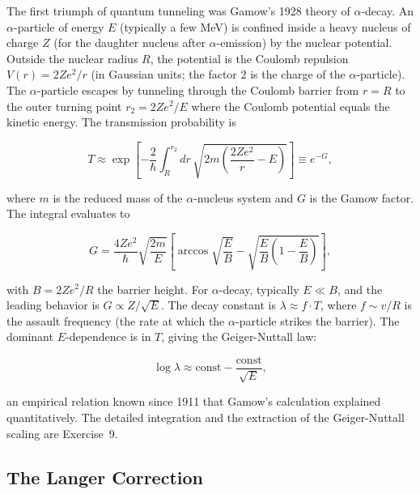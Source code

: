 The first triumph of quantum tunneling was Gamow's 1928 theory of $\alpha$-decay. An $\alpha$-particle of energy $E$ (typically a few MeV) is confined inside a heavy nucleus of charge $Z$ (for the daughter nucleus after $\alpha$-emission) by the nuclear potential. Outside the nuclear radius $R$, the potential is the Coulomb repulsion $V(r) = 2Ze^2/r$ (in Gaussian units; the factor $2$ is the charge of the $\alpha$-particle). The $\alpha$-particle escapes by tunneling through the Coulomb barrier from $r = R$ to the outer turning point $r_2 = 2Ze^2/E$ where the Coulomb potential equals the kinetic energy. The transmission probability is
\begin{linenomath}
\begin{equation}
T \approx \exp\left[-\frac{2}{\hbar}\int_R^{r_2} dr\,\sqrt{2m\left(\frac{2Ze^2}{r} - E\right)}\right] \equiv e^{-G},
\label{eq:gamow-alpha}
\end{equation}
\end{linenomath}
where $m$ is the reduced mass of the $\alpha$-nucleus system and $G$ is the Gamow factor. The integral evaluates to
\begin{linenomath}
\begin{equation}
G = \frac{4Ze^2}{\hbar}\sqrt{\frac{2m}{E}}\left[\arccos\sqrt{\frac{E}{B}} - \sqrt{\frac{E}{B}\left(1-\frac{E}{B}\right)}\right],
\end{equation}
\end{linenomath}
with $B = 2Ze^2/R$ the barrier height. For $\alpha$-decay, typically $E \ll B$, and the leading behavior is $G \propto Z/\sqrt{E}$. The decay constant is $\lambda \approx f \cdot T$, where $f \sim v/R$ is the assault frequency (the rate at which the $\alpha$-particle strikes the barrier). The dominant $E$-dependence is in $T$, giving the Geiger-Nuttall law:
\begin{linenomath}
\begin{equation}
\log\lambda \approx \text{const} - \frac{\text{const}}{\sqrt{E}},
\end{equation}
\end{linenomath}
an empirical relation known since 1911 that Gamow's calculation explained quantitatively. The detailed integration and the extraction of the Geiger-Nuttall scaling are Exercise~9.

\subsection{The Langer Correction}

